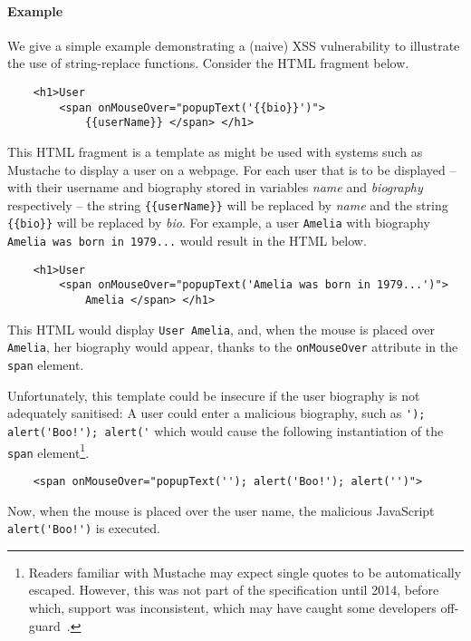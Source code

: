 
\paragraph{Example}

We give a simple example demonstrating a (naive) XSS vulnerability to illustrate the use of string-replace functions.
Consider the HTML fragment below.
\begin{verbatim}
    <h1>User 
        <span onMouseOver="popupText('{{bio}}')">
            {{userName}} </span> </h1>
\end{verbatim}
This HTML fragment is a template as might be used with systems such as Mustache to display a user on a webpage.
For each user that is to be displayed -- with their username and biography stored in variables \emph{name} and \emph{biography} respectively -- the string \verb+{{userName}}+ will be replaced by \emph{name} and the string \verb+{{bio}}+ will be replaced by \emph{bio}.
For example, a user \verb+Amelia+ with biography \verb+Amelia was born in 1979...+ would result in the HTML below.
\begin{verbatim}
    <h1>User 
        <span onMouseOver="popupText('Amelia was born in 1979...')">
            Amelia </span> </h1>
\end{verbatim}
This HTML would display \verb+User Amelia+, and, when the mouse is placed over \verb+Amelia+, her biography would appear, thanks to the \verb+onMouseOver+ attribute in the \verb+span+ element.

Unfortunately, this template could be insecure if the user biography is not adequately sanitised: 
A user could enter a malicious biography, such as \verb+'); alert('Boo!'); alert('+ which would cause the following instantiation of the \verb+span+ element\footnote{
    Readers familiar with Mustache may expect single quotes to be automatically escaped.
    However, this was not part of the specification until 2014, before which, support was inconsistent, which may have caught some developers off-guard~\cite{MustacheSingleQuote}.    
}.
\begin{verbatim}
    <span onMouseOver="popupText(''); alert('Boo!'); alert('')">
\end{verbatim}
Now, when the mouse is placed over the user name, the malicious JavaScript \verb+alert('Boo!')+ is executed.

